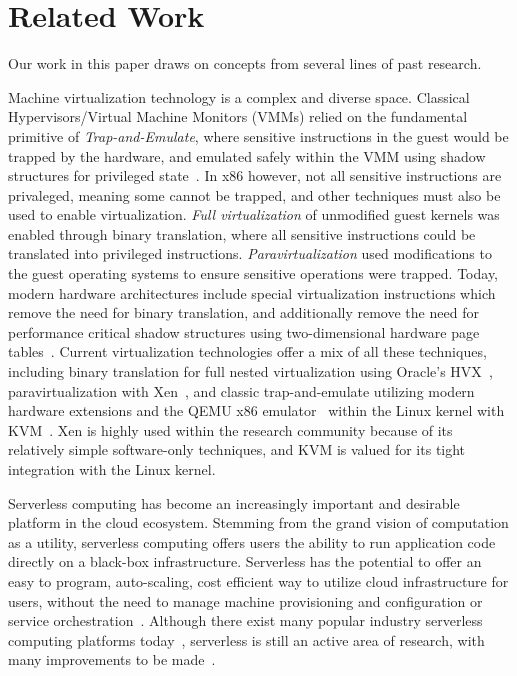 \section{Related Work} \label{sec:related}
Our work in this paper draws on concepts from several lines of past research.

 Machine virtualization technology is
a complex and diverse space. Classical Hypervisors/Virtual Machine Monitors
(VMMs) relied on the fundamental primitive of \emph{Trap-and-Emulate}, where
sensitive instructions in the guest would be trapped by the hardware, and
emulated safely within the VMM using shadow structures for privileged
state~\cite{classic-virt}. In x86 however, not all sensitive instructions are
privaleged, meaning some cannot be trapped, and other techniques must also be used
to enable virtualization. \emph{Full virtualization} of unmodified guest
kernels was enabled through binary translation, where all sensitive
instructions could be translated into privileged instructions.
\emph{Paravirtualization} used modifications to the guest operating systems to
ensure sensitive operations were trapped. Today, modern hardware architectures
include special virtualization instructions which remove the need for binary
translation, and additionally remove the need for performance critical shadow
structures using two-dimensional hardware page tables~\cite{virt-techniques}.
Current virtualization technologies offer a mix of all these techniques,
including binary translation for full nested virtualization using Oracle's
HVX~\cite{hvx}, paravirtualization with Xen~\cite{xen}, and classic
trap-and-emulate utilizing modern hardware extensions and the QEMU x86
emulator~\cite{qemu} within the Linux kernel with KVM~\cite{kvm}. Xen is highly
used within the research community because of its relatively simple
software-only techniques, and KVM is valued for its tight integration with the
Linux kernel.

 Serverless computing has become an
increasingly important and desirable platform in the cloud ecosystem. Stemming
from the grand vision of computation as a utility, serverless computing offers
users the ability to run application code directly on a black-box
infrastructure. Serverless has the potential to offer an easy to program,
auto-scaling, cost efficient way to utilize cloud infrastructure for users,
without the need to manage machine provisioning and configuration or service
orchestration~\cite{berkeley-serverless}. Although there exist many popular
industry serverless computing platforms
today~\cite{lambda}\cite{gcf}\cite{azure-cf}\cite{openwhisk}, serverless is
still an active area of research, with many improvements to be
made~\cite{peeking}\cite{trilemma}\cite{steps-back}.

